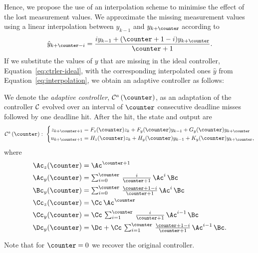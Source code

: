 Hence, we propose the use of an interpolation scheme to minimise the effect of the lost measurement values.
We approximate the missing measurement values using a linear interpolation between $y_{k-1}$ and $y_{k+\counter}$ according to
%
\begin{equation}
    \label{eq:interpolation}
    \hat y_{k+\counter-i} = \frac{i y_{k-1} + (\counter+1-i) y_{k+\counter}}{\counter+1} .
\end{equation}
%
If we substitute the values of $y$ that are missing in the ideal controller, Equation~\eqref{eq:ctrler-ideal}, with the corresponding interpolated ones $\hat y$ from Equation~\eqref{eq:interpolation}, we obtain an adaptive controller as follows:

\begin{definition}
    We denote the \emph{adaptive controller}, $\ctrler^a\funof{\counter}$, as an adaptation of the controller $\mathcal{C}$ evolved over an interval of $\counter$ consecutive deadline misses followed by one deadline hit.
    After the hit, the state and output are
    \begin{equation}
        \label{eq:adaptive}
           \ctrler^a\funof{\counter}: \,\,
            \left\{
            \begin{aligned}
                z_{k+\counter+1} &= F_z(\counter) z_{k} +  F_y(\counter) y_{k-1} + G_y(\counter) y_{k+\counter} \\
                u_{k+\counter+1} &= H_z(\counter) z_{k} + H_y(\counter) y_{k-1} + K_y(\counter) y_{k+\counter},
            \end{aligned}\right.
    \end{equation}
    where
    \begin{equation*}
        \begin{aligned}
         \Ac_z(\counter) &= \Ac^{\counter+1} \\
         \Ac_y(\counter) &= \textstyle\sum\nolimits_{i=0}^{\counter}\, \tfrac{i}{\counter+1}\, \Ac^{i}\, \Bc \\
         \Bc_y(\counter) &= \textstyle\sum\nolimits_{i=0}^{\counter}\, \tfrac{\counter+1-i}{\counter+1}\, \Ac^{i}\, \Bc \\
         \Cc_z(\counter) &= \Cc\, \Ac^\counter \\
         \Cc_y(\counter) &= \Cc\, \textstyle\sum\nolimits_{i=1}^{\counter}\, \tfrac{i}{\counter+1}\, \Ac^{i-1}\, \Bc \\
         \Dc_y(\counter) &= \Dc + \Cc\, \textstyle\sum\nolimits_{i=1}^{\counter}\, \tfrac{\counter+1-i}{\counter+1}\, \Ac^{i-1}\, \Bc.
         \end{aligned}
    \end{equation*}
\end{definition}
Note that for $\counter = 0$ we recover the original controller.

